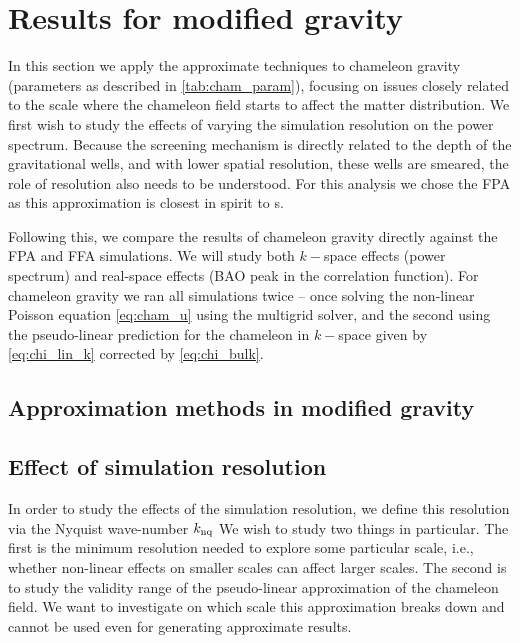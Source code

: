 \section{Results for modified gravity}
In this section we apply the approximate techniques to chameleon gravity (parameters as described in \autoref{tab:cham_param}), focusing on issues closely related to the scale where the chameleon field starts to affect the matter distribution. We first wish to study the effects of varying the simulation resolution on the power spectrum. Because the screening mechanism is directly related to the depth of the gravitational wells, and with lower spatial resolution, these wells are smeared, the role of resolution also needs to be understood. For this analysis we chose the FPA as this approximation is closest in spirit to \nbody s.

Following this, we compare the results of chameleon gravity directly against the FPA and FFA simulations. %
We will study both $k-$space effects (power spectrum) and real-space effects (BAO peak in the correlation function). For chameleon gravity we ran all simulations twice -- once solving the non-linear Poisson equation \eqref{eq:cham_u} using the multigrid solver, and the second using the pseudo-linear prediction for the chameleon in $k-$space given by \eqref{eq:chi_lin_k} corrected by \eqref{eq:chi_bulk}.

\subsection{Approximation methods in modified gravity}

\subsection{Effect of simulation resolution}
In order to study the effects of the simulation resolution, we define this resolution via the Nyquist wave-number $k_{\rm nq}$
We wish to study two things in particular. The first is the minimum resolution needed to explore some particular scale, i.e., whether non-linear effects on smaller scales can affect larger scales. The second is to study the validity range of the pseudo-linear approximation of the chameleon field. We want to investigate on which scale this approximation breaks down and cannot be used even for generating approximate results.

